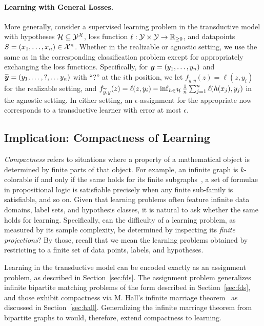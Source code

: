 \paragraph{Learning with General Losses.} %
More generally, consider a supervised learning problem in the transductive model with hypotheses $\mathcal{H} \subseteq \mathcal{Y}^{\mathcal{X}}$, loss function $\ell: \mathcal{Y} \times \mathcal{Y} \to \mathbb{R}_{\geq 0}$, and datapoints $S=(x_1,\ldots,x_n) \in \mathcal{X}^n$. Whether in the realizable or agnostic setting, we use the same \fds as in the corresponding classification problem except for appropriately exchanging the loss functions. Specifically, for $\boldsymbol{ y }=(y_1,\ldots,y_n)$ and $\widetilde{\boldsymbol{ y }}=(y_1,\ldots, ?, \ldots y_n)$ with ``?'' at the $i$th position, we let $f_{\tilde{y},y}(z) = \ell(z,y_i)$ for the realizable setting, and $f_{\widetilde{y},y}(z) = \ell(z,y_i) - \inf_{h \in \mathcal{H}} \frac{1}{n} \sum_{j=1}^n \ell(h(x_j),y_j)$ in the agnostic setting.  In either setting, an $\epsilon$-assignment for the appropriate \fds now corresponds to a transductive learner with error at most $\epsilon$.














\subsection{Implication: Compactness of Learning}
\label{sec:compactness}

 \emph{Compactness} refers to situations where a property of a mathematical object is determined by finite parts of that object. For example, an infinite graph is $k$-colorable if and only if the same holds for its finite subgraphs~\cite{bruijn1951colour}, a set of formulae in propositional logic is satisfiable precisely when any finite sub-family is satisfiable, and so on. Given that learning problems often feature infinite data domains, label sets, and hypothesis classes, it is natural to ask whether the same holds for learning. Specifically, can the difficulty of a learning problem, as measured by its sample complexity, be determined by inspecting its \emph{finite projections}? By those, recall that we mean the learning problems obtained by restricting to a finite set of data points, labels, and hypotheses.


 
 
Learning in the transductive model can be encoded exactly as an \fds assignment problem, as described in Section~\ref{sec:fds}.   The \fds assignment problem generalizes infinite bipartite matching problems of the form described in Section~\ref{sec:fds}, and those exhibit compactness via M. Hall's infinite marriage theorem~\cite{jr_distinct_1948} as discussed in Section~\ref{sec:hall}. Generalizing the infinite marriage theorem from bipartite graphs to \fdss would, therefore, extend compactness to learning.

